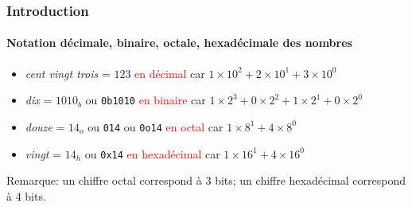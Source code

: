 \documentclass[xcolor=svgnames,final,smaller,a4]{beamer}
\begin{document}
\begin{frame}
  \frametitle{Introduction}
  \framesubtitle{Notation décimale, binaire,  octale, hexadécimale des nombres}


  \begin{itemize}
    \item
    \textit
   {cent vingt trois} = $123$ \textcolor{red}{en décimal}
  car $1 \times 10^2 + 2 \times 10^1 + 3 \times 10^0$

  \item
  \textit{dix} = $1010_b$ ou \texttt{0b1010}
  \textcolor{red}{en binaire}
  car $1  \times 2^3 + 0 \times 2^2 + 1 \times 2^1 + 0 \times 2^0$

  \item
  \textit{douze} = $14_o$ ou \texttt{014} ou \texttt{0o14}
  \textcolor{red}{en octal}
  car $1  \times 8^1 + 4 \times 8^0$

  \item \textit{vingt} =  $14_h$ ou \texttt{0x14}
  \textcolor{red}{en hexadécimal}
  car $1  \times 16^1 + 4 \times 16^0$
 
  \end{itemize}
  
  \vspace{1cm}
  Remarque: un chiffre octal correspond à 3 bits; un chiffre hexadécimal correspond à 4 bits.
\end{frame}
\end{document}
